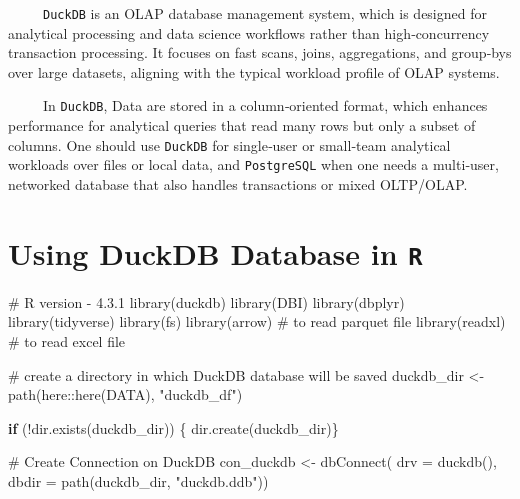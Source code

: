 \documentclass[
  letterpaper,
  DIV=11,
  numbers=noendperiod]{scrreprt}
\newenvironment{Shaded}{\begin{snugshade}}{\end{snugshade}}
\newcommand{\AttributeTok}[1]{\textcolor[rgb]{0.40,0.45,0.13}{#1}}
\newcommand{\CommentTok}[1]{\textcolor[rgb]{0.37,0.37,0.37}{#1}}
\newcommand{\ControlFlowTok}[1]{\textcolor[rgb]{0.00,0.23,0.31}{\textbf{#1}}}
\newcommand{\FunctionTok}[1]{\textcolor[rgb]{0.28,0.35,0.67}{#1}}
\newcommand{\NormalTok}[1]{\textcolor[rgb]{0.00,0.23,0.31}{#1}}
\newcommand{\OtherTok}[1]{\textcolor[rgb]{0.00,0.23,0.31}{#1}}
\newcommand{\SpecialCharTok}[1]{\textcolor[rgb]{0.37,0.37,0.37}{#1}}
\newcommand{\StringTok}[1]{\textcolor[rgb]{0.13,0.47,0.30}{#1}}
\begin{document}
~~~~~\texttt{DuckDB} is an OLAP database management system, which is
designed for analytical processing and data science workflows rather
than high‑concurrency transaction processing. It focuses on fast scans,
joins, aggregations, and group‑bys over large datasets, aligning with
the typical workload profile of OLAP systems.

~~~~~In \texttt{DuckDB}, Data are stored in a column‑oriented format,
which enhances performance for analytical queries that read many rows
but only a subset of columns. One should use \texttt{DuckDB} for
single‑user or small‑team analytical workloads over files or local data,
and \texttt{PostgreSQL} when one needs a multi‑user, networked database
that also handles transactions or mixed OLTP/OLAP.

\section{\texorpdfstring{Using DuckDB Database in
\texttt{R}}{Using DuckDB Database in R}}\label{using-duckdb-database-in-r}

\begin{Shaded}
\begin{Highlighting}[]
\CommentTok{\# R version {-} 4.3.1}
\FunctionTok{library}\NormalTok{(duckdb)}
\FunctionTok{library}\NormalTok{(DBI)}
\FunctionTok{library}\NormalTok{(dbplyr)}
\FunctionTok{library}\NormalTok{(tidyverse)}
\FunctionTok{library}\NormalTok{(fs)}
\FunctionTok{library}\NormalTok{(arrow) }\CommentTok{\# to read parquet file}
\FunctionTok{library}\NormalTok{(readxl) }\CommentTok{\# to read excel file}
\end{Highlighting}
\end{Shaded}

\begin{Shaded}
\begin{Highlighting}[]
\CommentTok{\# create a directory in which DuckDB database will be saved}
\NormalTok{duckdb\_dir }\OtherTok{\textless{}{-}} \FunctionTok{path}\NormalTok{(here}\SpecialCharTok{::}\FunctionTok{here}\NormalTok{(}\StringTok{\textquotesingle{}DATA\textquotesingle{}}\NormalTok{), }\StringTok{"duckdb\_df"}\NormalTok{)}

\ControlFlowTok{if}\NormalTok{ (}\SpecialCharTok{!}\FunctionTok{dir.exists}\NormalTok{(duckdb\_dir)) \{}
  \FunctionTok{dir.create}\NormalTok{(duckdb\_dir)\}}

\CommentTok{\# Create Connection on DuckDB}
\NormalTok{con\_duckdb }\OtherTok{\textless{}{-}} \FunctionTok{dbConnect}\NormalTok{(}
  \AttributeTok{drv =} \FunctionTok{duckdb}\NormalTok{(),}
  \AttributeTok{dbdir =} \FunctionTok{path}\NormalTok{(duckdb\_dir, }\StringTok{"duckdb.ddb"}\NormalTok{))}
\end{Highlighting}
\end{Shaded}
\end{document}
